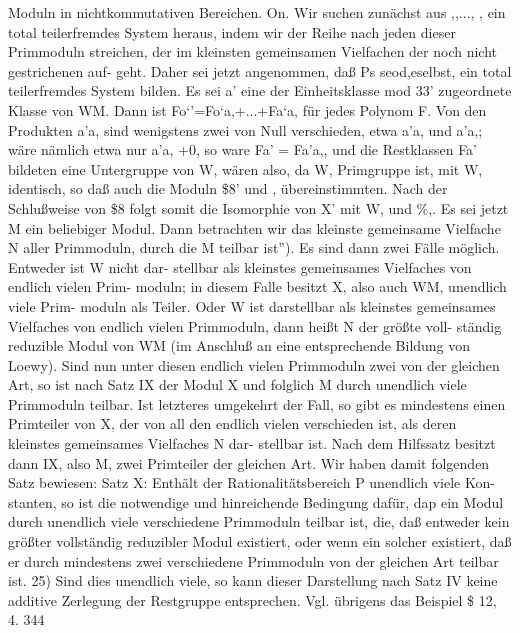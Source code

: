 \documentclass[11pt,a4paper]{article}
\theoremstyle{plain}
\theoremstyle{definition}
\begin{document}
Moduln in nichtkommutativen Bereichen. 
On. 
Wir suchen zunächst aus ,,..., , ein total teilerfremdes System 
heraus, indem wir der Reihe nach jeden dieser Primmoduln 
streichen, 
der im kleinsten gemeinsamen Vielfachen der noch nicht gestrichenen auf- 
geht. 
Daher 
sei jetzt angenommen, 
daß Ps seod,eselbst, 
ein 
total 
teilerfremdes System 
bilden. 
Es sei a' eine der Einheitsklasse mod 
33' 
zugeordnete Klasse von WM. 
Dann ist 
Fo`'=Fo`a,+...+Fa`a, 
für jedes Polynom F. Von den Produkten a'a, sind wenigstens zwei von 
Null verschieden, etwa a'a, und a'a,; wäre nämlich etwa nur a'a, +0, 
so ware Fa' = Fa'a,, und die Restklassen Fa' bildeten eine Untergruppe 
von W, wären also, da W, Primgruppe 
ist, mit W, identisch, 
so daß 
auch die Moduln \$8' und , übereinstimmten. 
Nach der Schlußweise von 
\$8 folgt somit die Isomorphie von X' mit W, und \%,. 
Es sei jetzt M ein beliebiger Modul. 
Dann betrachten 
wir das 
kleinste gemeinsame Vielfache N aller Primmoduln, durch die M teilbar 
ist''). 
Es sind dann zwei Fälle 
möglich. 
Entweder 
ist W nicht 
dar- 
stellbar 
als kleinstes gemeinsames 
Vielfaches 
von 
endlich 
vielen Prim- 
moduln; in diesem Falle besitzt X, also auch WM, unendlich 
viele Prim- 
moduln 
als Teiler. 
Oder W ist darstellbar 
als kleinstes gemeinsames 
Vielfaches von endlich vielen Primmoduln, dann heißt N der größte voll- 
ständig reduzible Modul 
von WM (im Anschluß 
an 
eine entsprechende 
Bildung von Loewy). 
Sind nun unter diesen endlich vielen Primmoduln 
zwei von der gleichen Art, so ist nach Satz IX der Modul X und folglich M 
durch unendlich viele Primmoduln teilbar. 
Ist letzteres umgekehrt der Fall, 
so gibt es mindestens einen Primteiler von X, der von 
all den endlich 
vielen verschieden ist, als deren kleinstes gemeinsames Vielfaches N dar- 
stellbar 
ist. 
Nach dem Hilfssatz besitzt dann IX, also M, zwei Primteiler 
der gleichen Art. 
Wir haben damit folgenden Satz bewiesen: 
Satz X: Enthält 
der Rationalitätsbereich P unendlich 
viele Kon- 
stanten, so ist die notwendige und hinreichende Bedingung dafür, dap 
ein Modul durch unendlich 
viele verschiedene Primmoduln 
teilbar 
ist, 
die, daß entweder 
kein größter vollständig 
reduzibler Modul 
existiert, 
oder wenn ein solcher existiert, daß er durch mindestens zwei verschiedene 
Primmoduln von der gleichen Art teilbar ist. 
25) Sind dies unendlich viele, so kann dieser Darstellung nach Satz IV keine additive 
Zerlegung der Restgruppe entsprechen. 
Vgl. übrigens das Beispiel \$ 12, 4. 
344
\end{document}
